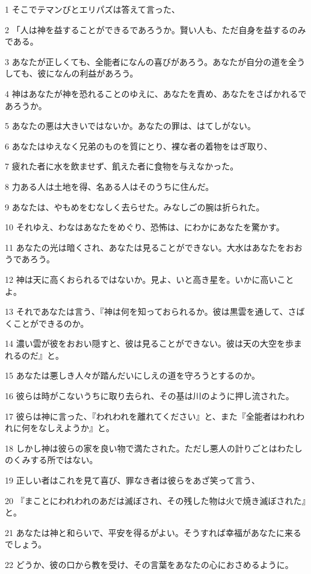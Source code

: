 \par 1 そこでテマンびとエリパズは答えて言った、
\par 2 「人は神を益することができるであろうか。賢い人も、ただ自身を益するのみである。
\par 3 あなたが正しくても、全能者になんの喜びがあろう。あなたが自分の道を全うしても、彼になんの利益があろう。
\par 4 神はあなたが神を恐れることのゆえに、あなたを責め、あなたをさばかれるであろうか。
\par 5 あなたの悪は大きいではないか。あなたの罪は、はてしがない。
\par 6 あなたはゆえなく兄弟のものを質にとり、裸な者の着物をはぎ取り、
\par 7 疲れた者に水を飲ませず、飢えた者に食物を与えなかった。
\par 8 力ある人は土地を得、名ある人はそのうちに住んだ。
\par 9 あなたは、やもめをむなしく去らせた。みなしごの腕は折られた。
\par 10 それゆえ、わなはあなたをめぐり、恐怖は、にわかにあなたを驚かす。
\par 11 あなたの光は暗くされ、あなたは見ることができない。大水はあなたをおおうであろう。
\par 12 神は天に高くおられるではないか。見よ、いと高き星を。いかに高いことよ。
\par 13 それであなたは言う、『神は何を知っておられるか。彼は黒雲を通して、さばくことができるのか。
\par 14 濃い雲が彼をおおい隠すと、彼は見ることができない。彼は天の大空を歩まれるのだ』と。
\par 15 あなたは悪しき人々が踏んだいにしえの道を守ろうとするのか。
\par 16 彼らは時がこないうちに取り去られ、その基は川のように押し流された。
\par 17 彼らは神に言った、『われわれを離れてください』と、また『全能者はわれわれに何をなしえようか』と。
\par 18 しかし神は彼らの家を良い物で満たされた。ただし悪人の計りごとはわたしのくみする所ではない。
\par 19 正しい者はこれを見て喜び、罪なき者は彼らをあざ笑って言う、
\par 20 『まことにわれわれのあだは滅ぼされ、その残した物は火で焼き滅ぼされた』と。
\par 21 あなたは神と和らいで、平安を得るがよい。そうすれば幸福があなたに来るでしょう。
\par 22 どうか、彼の口から教を受け、その言葉をあなたの心におさめるように。
